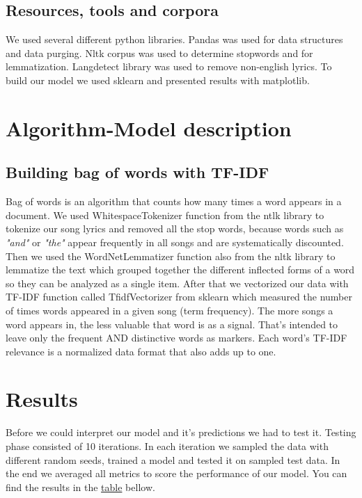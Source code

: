 \documentclass[a4paper,11pt]{article}
\begin{document}
\subsection{Resources, tools and corpora}

We used several different python libraries. Pandas was used for data structures and data purging. Nltk corpus was used to determine stopwords and for lemmatization. Langdetect library was used to remove non-english lyrics. To build our model we used sklearn and presented results with matplotlib.

\section{Algorithm-Model description}


\subsection{Building bag of words with TF-IDF}
Bag of words is an algorithm that counts how many times a word appears in a document. We used WhitespaceTokenizer function from the ntlk library to tokenize our song lyrics and removed all the stop words, because words such as \textit{"and"} or \textit{"the"} appear frequently in all songs and are systematically discounted. Then we used the WordNetLemmatizer function also from the nltk library to lemmatize the text which grouped together the different inflected forms of a word so they can be analyzed as a single item. After that we vectorized our data with TF-IDF function called TfidfVectorizer from sklearn which measured the number of times words appeared in a given song (term frequency). The more songs a word appears in, the less valuable that word is as a signal. That’s intended to leave only the frequent AND distinctive words as markers. Each word’s TF-IDF relevance is a normalized data format that also adds up to one.


\section{Results}

Before we could interpret our model and it's predictions we had to test it. Testing phase consisted of 10 iterations. In each iteration we sampled the data with different random seeds, trained a model and tested it on sampled test data. In the end we averaged all metrics to score the performance of our model. You can find the results in the \hyperref[label-model-score]{table} bellow.
\end{document}
